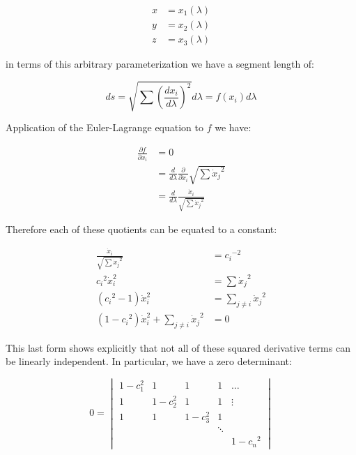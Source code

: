 \documentclass{article}
\newcommand{\xdot}[0]{\dot{x}}
\newcommand{\PD}[2]{\frac{\partial {#2}}{\partial {#1}}}
\begin{document}
\begin{align*}
x &= x_1(\lambda) \\
y &= x_2(\lambda) \\
z &= x_3(\lambda)
\end{align*}

in terms of this arbitrary parameterization we have a segment length of:

\begin{equation*}
ds = \sqrt{ \sum \left(\frac{d x_i}{d\lambda}\right)^2 } d \lambda = f\left(x_i\right) d\lambda
\end{equation*}

Application of the Euler-Lagrange equation to $f$ we have:

\begin{align*}
\PD{x_i}{f} 
&= 0 \\
&= \frac{d}{d\lambda} \PD{\xdot_i}{} \sqrt{ \sum {\xdot_j}^2 } \\
&= \frac{d}{d\lambda} \frac{ \xdot_i }{\sqrt{ \sum {\xdot_j}^2 }}
\end{align*}

Therefore each of these quotients can be equated to a constant:

\begin{align*}
\frac{ \xdot_i }{\sqrt{ \sum {\xdot_j}^2 }} &= {c_i}^{-2} \\
{c_i}^2 \xdot_i^2 &= \sum {\xdot_j}^2 \\
({c_i}^2 -1)\xdot_i^2 &= \sum_{j \ne i} {\xdot_j}^2 \\
(1 - {c_i}^2)\xdot_i^2 + \sum_{j \ne i} {\xdot_j}^2 &= 0 
\end{align*}

This last form shows explicitly that not all of these squared derivative terms can be linearly independent.  In particular, we have a
zero determinant:

\begin{equation*}
0 =
\begin{vmatrix}
1 - c_1^2   & 1            & 1         & 1 & \hdots \\
1           & 1 - c_2^2    & 1         & 1 & \vdots \\
1           & 1            & 1 - c_3^2 & 1 & \\
            &              &           & \ddots & \\
            &              &           &        & 1 - {c_n}^2
\end{vmatrix}
\end{equation*}
\end{document}
